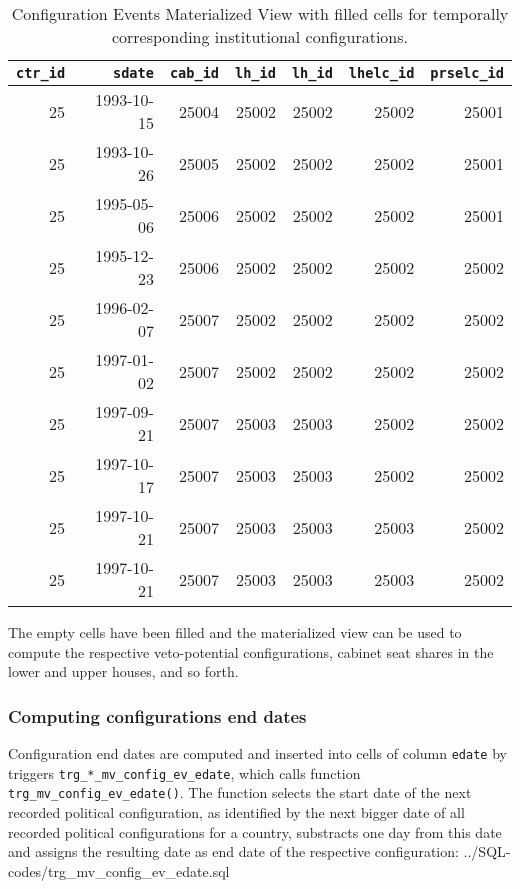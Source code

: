 \begin{table}[h!]
\centering\footnotesize
\caption{Configuration Events Materialized View with filled cells for temporally corresponding institutional configurations.}
\label{tab_mview_config_events_filled_cells}
\begin{tabular}{r r r r r r r}
\tabularnewline\toprule\toprule
\multicolumn{1}{r}{\texttt{ctr\_id}}	&
\multicolumn{1}{r}{\texttt{sdate}}	&	
\multicolumn{1}{r}{\texttt{cab\_id}}	&
\multicolumn{1}{r}{\texttt{lh\_id}}	&
\multicolumn{1}{r}{\texttt{lh\_id}}	&	
\multicolumn{1}{r}{\texttt{lhelc\_id}}	&	
\multicolumn{1}{r}{\texttt{prselc\_id}}	\\\midrule
25	&	1993-10-15	&	25004	&	25002	&	25002	&	25002	&	25001	\\
25	&	1993-10-26	&	25005	&	25002	&	25002	&	25002	&	25001	\\
25	&	1995-05-06	&	25006	&	25002	&	25002	&	25002	&	25001	\\
25	&	1995-12-23	&	25006	&	25002	&	25002	&	25002	&	25002	\\
25	&	1996-02-07	&	25007	&	25002	&	25002	&	25002	&	25002	\\
25	&	1997-01-02	&	25007	&	25002	&	25002	&	25002	&	25002	\\
25	&	1997-09-21	&	25007	&	25003	&	25003	&	25002	&	25002	\\
25	&	1997-10-17	&	25007	&	25003	&	25003	&	25002	&	25002	\\
25	&	1997-10-21	&	25007	&	25003	&	25003	&	25003	&	25002	\\
25	&	1997-10-21	&	25007	&	25003	&	25003	&	25003	&	25002	\\\bottomrule\bottomrule
\end{tabular}
\end{table}

The empty cells have been filled and the materialized view can be used to compute the respective veto-potential configurations, cabinet seat shares in the lower and upper houses, and so forth.

\subsubsection{Computing configurations end dates}\label{subsubsec_trg_mv_config_ev_edate}
Configuration end dates are computed and inserted into cells of column \texttt{edate} by triggers \texttt{trg\_*\_mv\_config\_ev\_edate}, which calls function \texttt{trg\_mv\_config\_ev\_edate()}.
The function selects the start date of the next recorded political configuration, as identified by the next bigger date of all recorded political configurations for a country, substracts one day from this date and assigns the resulting date as end date of the respective configuration:
%
{../SQL-codes/trg_mv_config_ev_edate.sql}

